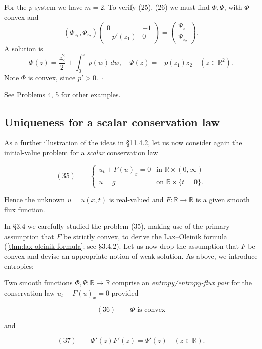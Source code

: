 \begin{example}
\label{ex:p-system-entropy-pair}
For the $p$-system we have $m=2$. To verify (25), (26) we must find $\Phi,\Psi$, with $\Phi$ convex and
$$(\Phi_{z_1},\Phi_{z_2})\begin{pmatrix} 0 & -1 \\ -p'(z_1) & 0 \end{pmatrix} = \begin{pmatrix} \Psi_{z_1} \\ \Psi_{z_2} \end{pmatrix}.$$
A solution is
$$\Phi(z) = \frac{z_2^2}{2} + \int_0^{z_1} p(w)\,dw, \quad \Psi(z) = -p(z_1)z_2 \quad (z\in\mathbb{R}^2).$$
Note $\Phi$ is convex, since $p'>0$. $\square$
\end{example}

See Problems 4, 5 for other examples.

\subsection{Uniqueness for a scalar conservation law}\label{sec:uniqueness-scalar-conservation-law-entropy}

As a further illustration of the ideas in \S11.4.2, let us now consider again the initial-value problem for a \textit{scalar} conservation law

$$(35) \qquad \begin{cases} u_t + F(u)_x = 0 & \text{in } \mathbb{R}\times(0,\infty) \\ u = g & \text{on } \mathbb{R}\times\{t=0\}. \end{cases}$$

Hence the unknown $u=u(x,t)$ is real-valued and $F:\mathbb{R}\to\mathbb{R}$ is a given smooth flux function.

In \S3.4 we carefully studied the problem (35), making use of the primary assumption that $F$ be strictly convex, to derive the Lax--Oleinik formula (\cref{thm:lax-oleinik-formula}; see \S3.4.2). Let us now drop the assumption that $F$ be convex and devise an appropriate notion of weak solution. As above, we introduce entropies:

\begin{definition}
\label{def:entropy-entropy-flux-pair-scalar}
Two smooth functions $\Phi,\Psi:\mathbb{R}\to\mathbb{R}$ comprise an \textit{entropy/entropy-flux pair} for the conservation law $u_t + F(u)_x = 0$ provided

$$(36) \qquad \Phi \text{ is convex}$$

and

$$(37) \qquad \Phi'(z)F'(z) = \Psi'(z) \quad (z\in\mathbb{R}).$$
\end{definition}

